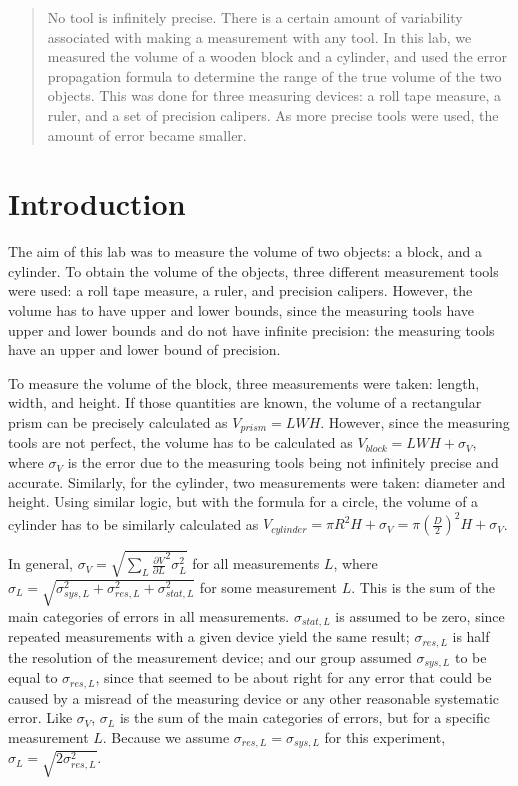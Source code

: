 \documentclass{article}
\begin{document}
\maketitle

\begin{abstract}

	No tool is infinitely precise. There is a certain amount of variability associated with making a measurement with any tool. In this lab, we measured the volume of a wooden block and a cylinder, and used the error propagation formula to determine the range of the true volume of the two objects. This was done for three measuring devices: a roll tape measure, a ruler, and a set of precision calipers. As more precise tools were used, the amount of error became smaller.

\end{abstract}



\section{Introduction}

The aim of this lab was to measure the volume of two objects: a block, and a cylinder. To obtain the volume of the objects, three different measurement tools were used: a roll tape measure, a ruler, and precision calipers. However, the volume has to have upper and lower bounds, since the measuring tools have upper and lower bounds and do not have infinite precision: the measuring tools have an upper and lower bound of precision.

To measure the volume of the block, three measurements were taken: length, width, and height. If those quantities are known, the volume of a rectangular prism can be precisely calculated as $V_{prism}=LWH$. However, since the measuring tools are not perfect, the volume has to be calculated as $V_{block}=LWH+\sigma_{V}$, where $\sigma_{V}$ is the error due to the measuring tools being not infinitely precise and accurate. Similarly, for the cylinder, two measurements were taken: diameter and height. Using similar logic, but with the formula for a circle, the volume of a cylinder has to be similarly calculated as $V_{cylinder}=\pi R^{2}H + \sigma_{V}=\pi (\frac{D}{2})^{2}H+\sigma_{V}$.

In general, $\sigma_{V}= \sqrt{\sum_{L} \frac{\partial V}{\partial L}^{2}\sigma_{L}^{2}}$ for all measurements $L$, where $\sigma_{L}=\sqrt{\sigma_{sys,L}^{2}+\sigma_{res,L}^{2}+\sigma_{stat,L}^{2}}$ for some measurement $L$. This is the sum of the main categories of errors in all measurements. $\sigma_{stat,L}$ is assumed to be zero, since repeated measurements with a given device yield the same result; $\sigma_{res,L}$ is half the resolution of the measurement device; and our group assumed $\sigma_{sys,L}$ to be equal to $\sigma_{res,L}$, since that seemed to be about right for any error that could be caused by a misread of the measuring device or any other reasonable systematic error. Like $\sigma_{V}$, $\sigma_{L}$ is the sum of the main categories of errors, but for a specific measurement $L$. Because we assume $\sigma_{res,L}=\sigma_{sys,L}$ for this experiment, $\sigma_{L}=\sqrt{2\sigma_{res,L}^{2}}$.
\end{document}
